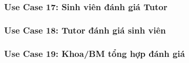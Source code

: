 \newpage
\subsubsection*{Use Case 17: Sinh viên đánh giá Tutor}
\begin{samepage}

\end{samepage}


\newpage
\subsubsection*{Use Case 18: Tutor đánh giá sinh viên}
\begin{samepage}

\end{samepage}


\newpage
\subsubsection*{Use Case 19: Khoa/BM tổng hợp đánh giá}
\begin{samepage}

\end{samepage}

